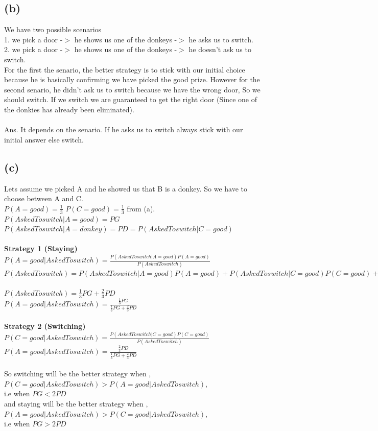 \documentclass[a4paper,11pt]{article}
\begin{document}
\subsection*{(b)}
We have two possible scenarios \\
1. we pick a door  -$>$ he shows us  one of the donkeys -$>$ he asks us to switch.\\
2. we pick a door -$>$ he shows us  one of the donkeys -$>$  he doesn't ask us to switch.\\
For the first the senario, the better strategy is to stick with our initial choice because he is basically confirming we have picked the good prize. 
However for the second senario,  he didn't ask us to switch because we have the wrong door, So  we should switch. If we switch we are guaranteed to get the right door (Since one of the donkies has already been eliminated).\\\\
Ans. It depends on the senario. If he asks us to switch always stick with our initial answer else switch.

\subsection*{(c)}

Lets assume we picked A and he showed us that B is a donkey. So we have to choose between A and C.\\
$P(A=good) = \frac{1}{3}$ $P(C=good) = \frac{1}{3}$ from (a). \\
$P(AskedToswitch| A = good ) = PG$ \\$P(AskedToswitch| A = donkey ) = PD = P(AskedToswitch| C = good )$ \\\\
\textbf{Strategy 1 (Staying)}\\
$P(A=good|AskedToswitch) = \frac{P(AskedToswitch| A = good )P(A=good)}{P(AskedToswitch)}$\\
$P(AskedToswitch) = P(AskedToswitch|A=good)P(A=good)+ P(AskedToswitch|C=good)P(C=good)+ P(AskedToswitch|C=good)P(C=good)$\\\\
$ P(AskedToswitch) = \frac{1}{3}PG+\frac{2}{3}PD$\\
$P(A=good|AskedToswitch) = \frac{\frac{1}{3}PG}{\frac{1}{3}PG+\frac{2}{3}PD}$\\\\
\textbf{Strategy 2 (Switching)}\\
$P(C=good|AskedToswitch) = \frac{P(AskedToswitch| C = good )P(C=good)}{P(AskedToswitch)}$\\
$P(A=good|AskedToswitch) = \frac{\frac{2}{3}PD}{\frac{1}{3}PG+\frac{2}{3}PD}$\\\\
So switching will be the better strategy when ,\\
$P(C=good|AskedToswitch) > P(A=good|AskedToswitch)$, \\i.e when $ PG < 2PD$\\
and staying will be the better strategy when ,\\
$P(A=good|AskedToswitch) > P(C=good|AskedToswitch)$, \\i.e when $ PG > 2PD$\\
\end{document}
